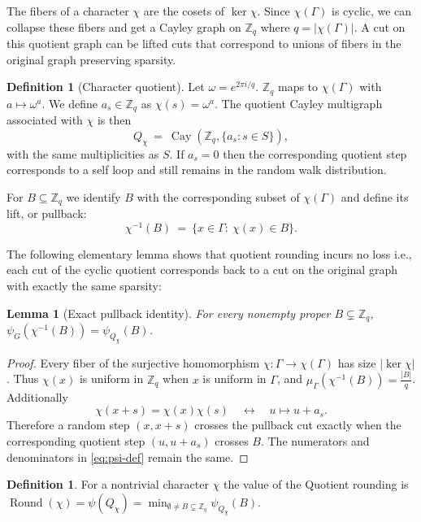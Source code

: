 \documentclass[11pt]{article}
\newtheorem{lemma}[theorem]{Lemma}
\theoremstyle{definition}
\newtheorem{definition}[theorem]{Definition}
\theoremstyle{remark}
\newcommand{\Z}{\mathbb{Z}}
\newcommand{\Cay}{\operatorname{Cay}}
\newcommand{\roundval}{\operatorname{Round}}
\begin{document}
The fibers of a character $\chi$ are the cosets of $\ker \chi$. Since $\chi(\Gamma)$ is cyclic, we can collapse these fibers and get a Cayley graph on $\mathbb{Z}_q$ where $q=|\chi(\Gamma)|$. A cut on this quotient graph can be lifted cuts that correspond to unions of fibers in the original graph preserving sparsity.


\begin{definition}[Character quotient]\label{def:character-quotient}
Let $\omega = e^{2\pi i/q}$. $\mathbb{Z}_q$ maps to $\chi(\Gamma)$ with $a \mapsto \omega^a$. We define $a_s \in \mathbb{Z}_q$ as $\chi(s) = \omega^a$. The quotient Cayley multigraph associated with $\chi$ is then
\[
  Q_\chi ~=~ \Cay(\Z_q,\{a_s:s\in S\}),
\]
with the same multiplicities as $S$. If $a_s=0$ then the corresponding quotient step corresponds to a self loop and still remains in the random walk distribution.
\end{definition}

For $B\subseteq\Z_q$ we identify $B$ with the corresponding subset of $\chi(\Gamma)$ and define its lift, or pullback: 
\[
  \chi^{-1}(B) ~=~ \big\{x\in\Gamma:~\chi(x)\in B \big\}.
\]

The following elementary lemma shows that quotient rounding incurs no loss i.e., each cut of the cyclic quotient corresponds  back to a cut on the original graph with exactly the same sparsity:

\begin{lemma}[Exact pullback identity]\label{lem:pullback-identity}
For every nonempty proper $B\subsetneq\Z_q$, $\psi_G(\chi^{-1}(B))=\psi_{Q_\chi}(B)$.
\end{lemma}

\begin{proof}
Every fiber of the surjective homomorphism $\chi:\Gamma\to\chi(\Gamma)$ has size $|\ker\chi|$. Thus $\chi(x)$ is uniform in $\Z_q$ when $x$ is uniform in $\Gamma$, and $\mu_\Gamma(\chi^{-1}(B))=\frac{|B|}{q}$. Additionally
\[
  \chi(x+s)=\chi(x)\chi(s)
  \quad\longleftrightarrow\quad
  u\mapsto u+a_s.
\]
Therefore a random step $(x,x+s)$ crosses the pullback cut exactly when the corresponding quotient step $(u,u+a_s)$ crosses $B$. The numerators and denominators in \eqref{eq:psi-def} remain the same.
\end{proof}

\begin{definition}
\label{def:round-value}
For a nontrivial character $\chi$  the value of the Quotient rounding is $\roundval(\chi) = \psi(Q_\chi)
  = \min_{\emptyset\ne B\subsetneq\Z_q}\psi_{Q_\chi}(B)$.
\end{definition}
\end{document}
